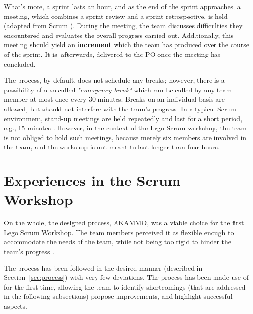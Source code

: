\documentclass[conference]{IEEEtran}
\begin{document}
What's more, a sprint lasts an hour, and as the end of the sprint approaches, a
meeting, which combines a sprint review and a sprint retrospective, is held
(adapted from Scrum \cite{Schwaber2020}). During the meeting, the team
discusses difficulties they encountered and evaluates the overall progress
carried out. Additionally, this meeting should yield an \textbf{increment}
which the team has produced over the course of the sprint. It is, afterwards,
delivered to the PO once the meeting has concluded.

The process, by default, does not schedule any breaks; however, there is a
possibility of a so-called \textit{"emergency break"} which can be called by any
team member at most once every 30 minutes. Breaks on an individual basis are
allowed, but should not interfere with the team's progress. In a typical Scrum
environment, stand-up meetings are held repeatedly and last for a short period,
e.g., 15 minutes \cite{Schwaber2020}. However, in the context of the Lego Scrum
workshop, the team is not obliged to hold such meetings, because merely six
members are involved in the team, and the workshop is not meant to last longer
than four hours.

\section{Experiences in the Scrum Workshop}
\label{sec:experiences}


On the whole, the designed process, {\selectfont AKAMMO},
was a viable choice for the first Lego Scrum Workshop. The team members perceived
it as flexible enough to accommodate the needs of the team, while not being too
rigid to hinder the team's progress \cite{DIT348A2}.

The process has been followed in the desired manner (described in
Section~\ref{sec:process}) with very few deviations. The process has
been made use of for the first time, allowing the team to identify shortcomings
(that are addressed in the following subsections) propose improvements, and
highlight successful aspects. 
\end{document}
